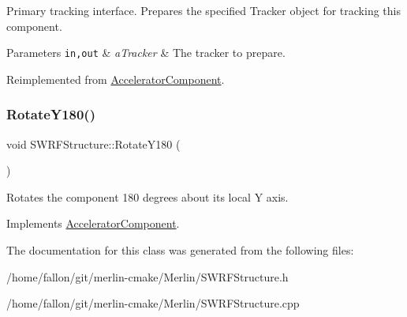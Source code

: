 Primary tracking interface. Prepares the specified Tracker object for tracking this component. 
\begin{DoxyParams}[1]{Parameters}
\mbox{\tt in,out}  & {\em a\+Tracker} & The tracker to prepare. \\
\hline
\end{DoxyParams}


Reimplemented from \hyperlink{classAcceleratorComponent_ab897c54689ac946f40c3ad0716ddd4bb}{Accelerator\+Component}.

\mbox{\label{classSWRFStructure_a886ea9cbbef4255f784f440be7c45a91}} 
\subsubsection{\texorpdfstring{Rotate\+Y180()}{RotateY180()}}
{\footnotesize\ttfamily void S\+W\+R\+F\+Structure\+::\+Rotate\+Y180 (\begin{DoxyParamCaption}{ }\end{DoxyParamCaption})\hspace{0.3cm}{\ttfamily [virtual]}}

Rotates the component 180 degrees about its local Y axis. 

Implements \hyperlink{classAcceleratorComponent_a8bf0d39b56578ca99f286ca1504b9072}{Accelerator\+Component}.



The documentation for this class was generated from the following files\+:\begin{DoxyCompactItemize}
\item 
/home/fallon/git/merlin-\/cmake/\+Merlin/S\+W\+R\+F\+Structure.\+h\item 
/home/fallon/git/merlin-\/cmake/\+Merlin/S\+W\+R\+F\+Structure.\+cpp\end{DoxyCompactItemize}
